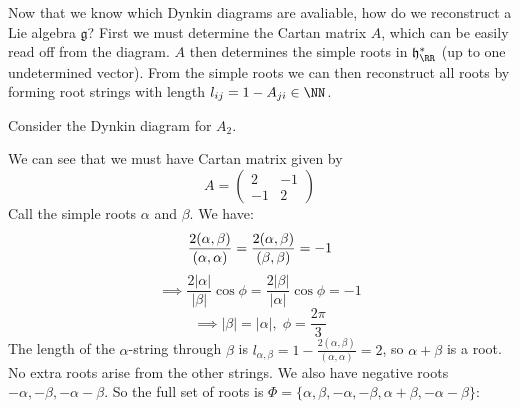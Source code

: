 \documentclass{jknotes}
\begin{document}
Now that we know which Dynkin diagrams are avaliable, how do we reconstruct a Lie algebra \(\mathfrak{g}\)? First we must determine the Cartan matrix \(A\), which can be easily read off from the diagram. \(A\) then determines the simple roots in \(\mathfrak{h}^*_\RR\) (up to one undetermined vector). From the simple roots we can then reconstruct all roots by forming root strings with length \(l_{ij}=1-A_{ji} \in \NN\).

\begin{eg}
    Consider the Dynkin diagram for \(A_2\). 
    \begin{figure}[H]
        \centering
    \end{figure}
    We can see that we must have Cartan matrix given by 
    \begin{equation}
        A = 
        \begin{pmatrix}
            2 & -1 \\
            -1 & 2
        \end{pmatrix}
    \end{equation}
    Call the simple roots \(\alpha\) and \(\beta\). We have:
    \begin{equation}
        \frac{2(\alpha,\beta)}{(\alpha,\alpha)} = \frac{2(\alpha,\beta)}{(\beta,\beta)} = -1\\
    \end{equation}
    \begin{equation}
        \implies \frac{2|\alpha|}{|\beta|}\cos\phi = \frac{2|\beta|}{|\alpha|}\cos\phi = -1
    \end{equation}
    \begin{equation}
        \implies |\beta|=|\alpha|,\; \phi = \frac{2\pi}{3}
    \end{equation}
    The length of the \(\alpha\)-string through \(\beta\) is \(l_{\alpha,\beta} =  1 - \frac{2(\alpha,\beta)}{(\alpha,\alpha)} = 2\), so \(\alpha+\beta\) is a root. No extra roots arise from the other strings. We also have negative roots \(-\alpha,-\beta,-\alpha-\beta\). So the full set of roots is \(\Phi=\{\alpha,\beta,-\alpha,-\beta,\alpha+\beta,-\alpha-\beta\}\):
    \begin{figure}[H]
        \centering
        \begin{tikzpicture}

\end{tikzpicture}
\end{figure}
\end{eg}
\end{document}
